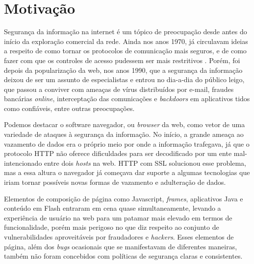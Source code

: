 \section{Motivação}


Segurança da informação na internet é um tópico de preocupação desde antes do início da exploração comercial da rede. Ainda nos anos 1970, já circulavam ideias a respeito de como tornar os protocolos de comunicação mais seguros, e de como fazer com que os controles de acesso pudessem ser mais restritivos \cite{WSP2015}. Porém, foi depois da popularização da web, nos anos 1990, que a segurança da informação deixou de ser um assunto de especialistas e entrou no dia-a-dia do público leigo, que passou a conviver com ameaças de vírus distribuídos por e-mail, fraudes bancárias \textit{online}, interceptação das comunicações e \textit{backdoors} em aplicativos tidos como confiáveis, entre outras preocupações.

Podemos destacar o software navegador, ou \textit{browser} da web, como vetor de uma variedade de ataques à segurança da informação. No início, a grande ameaça ao vazamento de dados era o próprio meio por onde a informação trafegava, já que o protocolo HTTP não oferece dificuldades para ser decodificado por um ente mal-intencionado entre dois \textit{hosts} na web. HTTP com SSL solucionou esse problema, mas a essa altura o navegador já começava dar suporte a algumas tecnologias que iriam tornar possíveis novas formas de vazamento e adulteração de dados.

Elementos de composição de página como Javascript, \textit{frames}, aplicativos Java e conteúdo em Flash entraram em cena quase simultaneamente, levando a experiência de usuário na web para um patamar mais elevado em termos de funcionalidade, porém mais perigoso no que diz respeito ao conjunto de vulnerabilidades aproveitáveis por fraudadores e \textit{hackers}. Esses elementos de página, além dos \textit{bugs} ocasionais que se manifestavam de diferentes maneiras, também não foram concebidos com políticas de segurança claras e consistentes.




